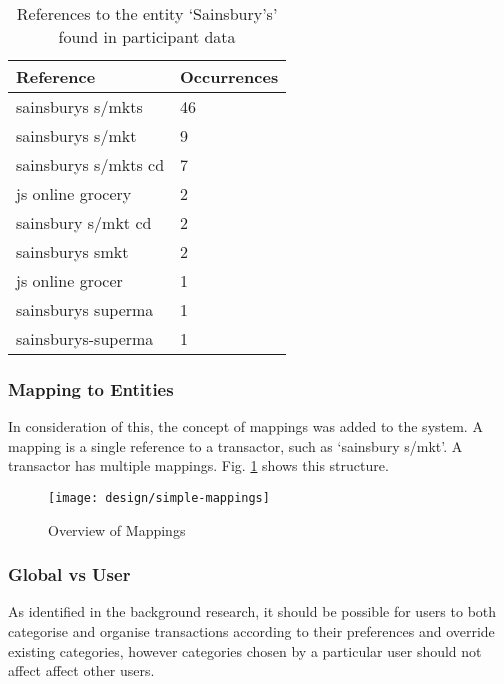 \begin{table}[h]
\centering
\begin{tabular}{@{}ll@{}}
\toprule
Reference            & Occurrences \\ \midrule
sainsburys s/mkts    & 46          \\
sainsburys s/mkt     & 9           \\
sainsburys s/mkts cd & 7           \\
js online grocery    & 2           \\
sainsbury s/mkt cd   & 2           \\
sainsburys smkt      & 2           \\
js online grocer     & 1           \\
sainsburys superma   & 1           \\
sainsburys-superma   & 1           \\ \bottomrule
\end{tabular}
\caption{References to the entity `Sainsbury's' found in participant data}
\label{tab:sainsburys}
\end{table}

\subsubsection{Mapping to Entities}
In consideration of this, the concept of mappings was added to the system. A \gls{mapping} is a single \gls{reference} to a transactor, such as `sainsbury s/mkt'. A transactor has multiple mappings. Fig. \ref{fig:mapping} shows this structure.

\begin{figure}[h]
    \centering
    \texttt{[image: design/simple-mappings]}
    \caption{Overview of Mappings}
    \label{fig:mapping}
    
    \begin{comment}
[Transaction]<>*-[TransactorMapping]
[TransactorMapping]<>*-[Transactor]
    \end{comment}
\end{figure}


\subsubsection{Global vs User}
As identified in the background research, it should be possible for users to both categorise and organise transactions according to their preferences and override existing categories, however categories chosen by a particular user should not affect affect other users. 

